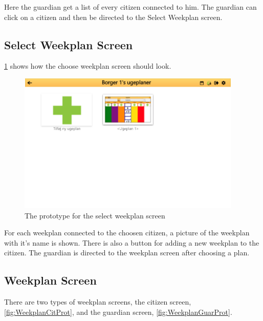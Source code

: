 Here the guardian get a list of every citizen connected to him. The guardian can click on a citizen and then be directed to the Select Weekplan screen. 

\subsection*{Select Weekplan Screen}

\ref{fig:ChooseWeekProt} shows how the choose weekplan screen should look.
\begin{figure}[H]
    \begin{center}
        \includegraphics[width=0.95\textwidth]{figures/Prototypes/SelectWeekplanPrototype.png}
    \end{center}
    \caption{The prototype for the select weekplan screen}
    \label{fig:ChooseWeekProt}
\end{figure}

For each weekplan connected to the choosen citizen, a picture of the weekplan with it's name is shown. There is also a button for adding a new weekplan to the citizen.
The guardian is directed to the weekplan screen after choosing a plan.

\subsection*{Weekplan Screen}
There are two types of weekplan screens, the citizen screen, \ref{fig:WeekplanCitProt}, and the guardian screen, \ref{fig:WeekplanGuarProt}. 

